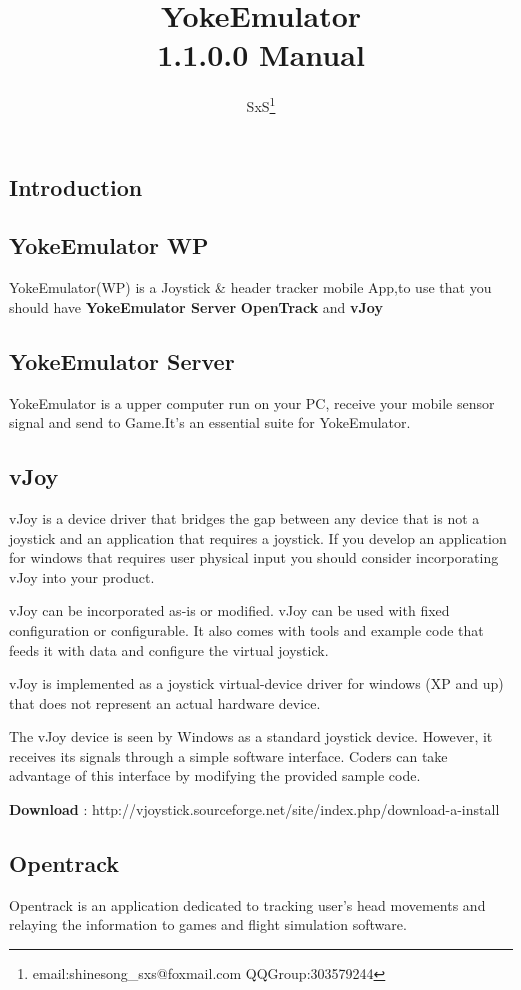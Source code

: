 \documentclass[12pt,a4paper]{article}
\title{{\Huge{YokeEmulator}} \\1.1.0.0 Manual}
\author{SxS\footnote{email:shinesong\_sxs@foxmail.com QQGroup:303579244}}
\begin{document}
\begin{CJK}{UTF8}{gbsn}
\maketitle
\newpage
\tableofcontents

\newpage
\section{Introduction}
\subsection{YokeEmulator WP}
YokeEmulator(WP) is a Joystick \& header tracker mobile App,to use that you should have \textbf{YokeEmulator Server} \textbf{OpenTrack} and \textbf{vJoy}
\subsection{YokeEmulator Server}
YokeEmulator is a upper computer run on your PC, receive your mobile sensor signal and send to Game.It's an essential suite for YokeEmulator.
\subsection{vJoy}
vJoy is a device driver that bridges the gap between any device that is not a joystick and an application that requires a joystick. If you develop an application for windows that requires user physical input you should consider incorporating vJoy into your product.


vJoy can be incorporated as-is or modified. vJoy can be used with fixed configuration or configurable. It also comes with tools and example code that feeds it with data and configure the virtual joystick.


vJoy is implemented as a joystick virtual-device driver for windows (XP and up) that does not represent an actual hardware device.


The vJoy device is seen by Windows as a standard joystick device. However, it receives its signals through a simple software interface. Coders can take advantage of this interface by modifying the provided sample code.


\textbf{Download} : http://vjoystick.sourceforge.net/site/index.php/download-a-install
\subsection{Opentrack}
Opentrack is an application dedicated to tracking user's head movements and relaying the information to games and flight simulation software.



\end{CJK}
\end{document}
